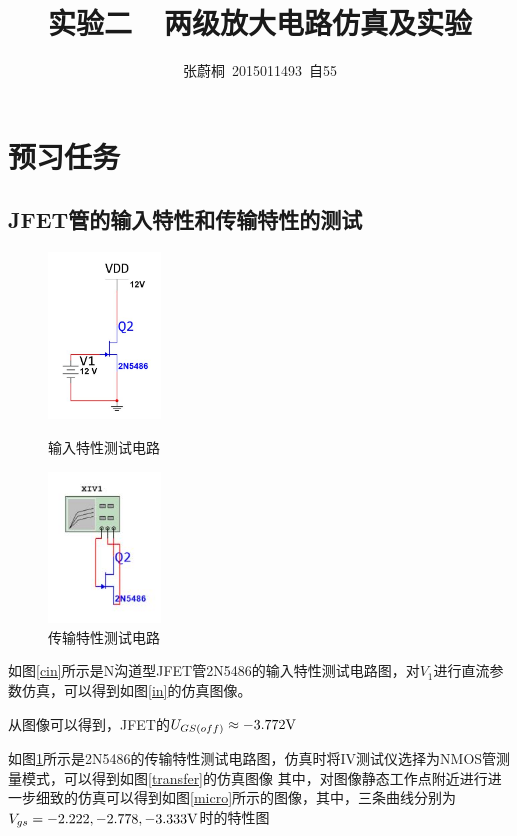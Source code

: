 \documentclass[UTF8,a4paper]{ctexart}
\title{实验二\ \ 两级放大电路仿真及实验}
\author{张蔚桐\ 2015011493\ 自55}
\begin{document}
\maketitle
\section{预习任务}
\subsection{JFET管的输入特性和传输特性的测试}
\begin{figure}
\includegraphics [width=30mm]{in.jpg}
\caption{输入特性测试电路}
\label{cin}
\includegraphics [width = 30mm]{transfer.jpg}
\caption{传输特性测试电路}
\label{ctransfer}
\end{figure}
如图\ref{cin}所示是N沟道型JFET管2N5486的输入特性测试电路图，对$V_1$进行直流参数仿真，可以得到如图\ref{in}的仿真图像。

从图像可以得到，JFET的$U_{GS(off)}\approx-3.772\rm{V}$

如图\ref{ctransfer}所示是2N5486的传输特性测试电路图，仿真时将IV测试仪选择为NMOS管测量模式，可以得到如图\ref{transfer}的仿真图像
其中，对图像静态工作点附近进行进一步细致的仿真可以得到如图\ref{micro}所示的图像，其中，三条曲线分别为$V_{gs}=-2.222,-2.778,-3.333\rm{V}$时的特性图
\end{document}

